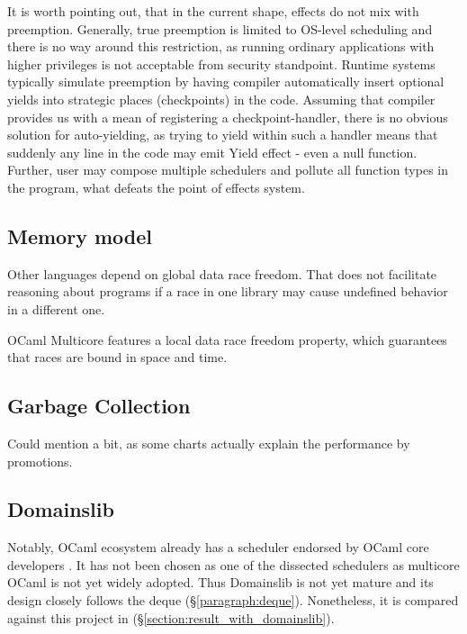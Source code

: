 \documentclass[12pt,a4paper,twoside]{report}
\begin{document}
\label{paragraph:ocaml_preemption}
It is worth pointing out, that in the current shape, effects do not mix with preemption. Generally, true preemption is limited to OS-level scheduling and there is no way around this restriction, as running ordinary applications with higher privileges is not acceptable from security standpoint. Runtime systems typically simulate preemption by having compiler automatically insert optional yields into strategic places (checkpoints) in the code. Assuming that compiler provides us with a mean of registering a checkpoint-handler, there is no obvious solution for auto-yielding, as trying to yield within such a handler means that suddenly any line in the code may emit Yield effect - even a null function. Further, user may compose multiple schedulers and pollute all function types in the program, what defeats the point of effects system. 

\subsection{Memory model}
\label{section:memory_model}
Other languages depend on global data race freedom. That does not facilitate reasoning about programs if a race in one library may cause undefined behavior in a different one. 

OCaml Multicore features a local data race freedom property, which guarantees that races are bound in space and time. 


\subsection{Garbage Collection}
Could mention a bit, as some charts actually explain the performance by promotions.


\subsection{Domainslib}

Notably, OCaml ecosystem already has a scheduler endorsed by OCaml core developers \cite{ocamlmul59:online}. It has not been chosen as one of the dissected schedulers as multicore OCaml is not yet widely adopted. Thus Domainslib is not yet mature and its design closely follows the deque (\S\ref{paragraph:deque}). Nonetheless, it is compared against this project in (\S\ref{section:result_with_domainslib}).
\end{document}

